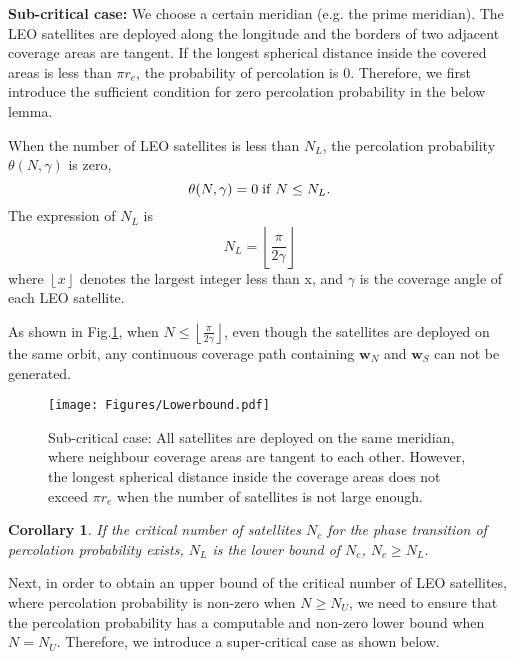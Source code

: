\documentclass[final]{IEEEtran}
\newtheorem{corollary}{Corollary}
\begin{document}
\noindent \textbf{Sub-critical case:} We choose a certain meridian (e.g. the prime meridian). The LEO satellites are deployed along the longitude and the borders of two adjacent coverage areas are tangent. If the longest spherical distance inside the covered areas is less than $\pi r_e$, the probability of percolation is 0. Therefore, we first introduce the sufficient condition for zero percolation probability in the below lemma. 
\begin{lemma}\label{lem:lowerbound}
    When the number of LEO satellites is less than $N_L$, the percolation probability $\theta(N,\gamma)$ is zero, \ie
\begin{equation}
    \theta(N,\gamma)=0\;{\rm if}\;N\leq N_L.
\end{equation}    
    The expression of $N_L$ is
\begin{equation}
    N_L = \left \lfloor \frac{\pi}{2\gamma} \right \rfloor 
\label{lowerbound}
\end{equation}
where $\left \lfloor x \right \rfloor$ denotes the largest integer less than x, and $\gamma$ is the coverage angle of each LEO satellite.
\end{lemma}
\begin{IEEEproof}
    As shown in Fig.\ref{fig:lowerbound}, when $N\leq\left \lfloor \frac{\pi}{2\gamma} \right \rfloor$, even though the satellites are deployed on the same orbit, any continuous coverage path containing $\textbf{w}_N$ and $\textbf{w}_S$ can not be generated.
\end{IEEEproof}
\begin{figure}
    \centering
    \texttt{[image: Figures/Lowerbound.pdf]}
    \caption{Sub-critical case: All satellites are deployed on the same meridian, where neighbour coverage areas are tangent to each other. However, the longest spherical distance inside the coverage areas does not exceed $\pi r_e$ when the number of satellites is not large enough.}
    \label{fig:lowerbound}
\end{figure}

\begin{corollary}
    If the critical number of satellites $N_c$ for the phase transition of percolation probability exists, $N_L$ is the lower bound of $N_c$, \ie $N_c\geq N_L$.
    \label{cor:subcritical}
\end{corollary}

Next, in order to obtain an upper bound of the critical number of LEO satellites, where percolation probability is non-zero when $N\geq N_U$, we need to ensure that the percolation probability has a computable and non-zero lower bound when $N=N_U$. Therefore, we introduce a super-critical case as shown below.\\ 
\end{document}
